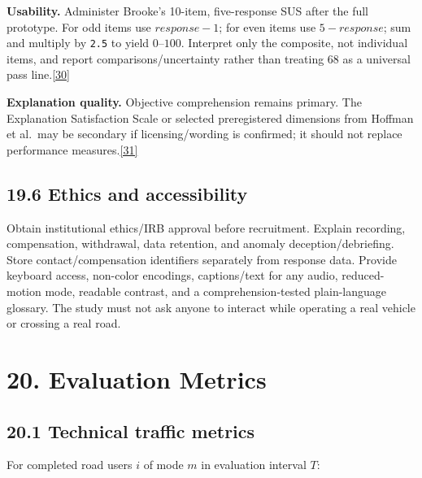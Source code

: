 \documentclass[
  english,
  11pt,
  a4paper,
]{article}
\begin{document}
\textbf{Usability.} Administer Brooke's 10-item, five-response SUS after
the full prototype. For odd items use \(response-1\); for even items use
\(5-response\); sum and multiply by \texttt{2.5} to yield \(0–100\).
Interpret only the composite, not individual items, and report
comparisons/uncertainty rather than treating 68 as a universal pass
line.\hyperref[source-30]{[30]}

\textbf{Explanation quality.} Objective comprehension remains primary.
The Explanation Satisfaction Scale or selected preregistered dimensions
from Hoffman et al.~may be secondary if licensing/wording is confirmed;
it should not replace performance measures.\hyperref[source-31]{[31]}

\subsection{19.6 Ethics and
accessibility}\label{ethics-and-accessibility}

Obtain institutional ethics/IRB approval before recruitment. Explain
recording, compensation, withdrawal, data retention, and anomaly
deception/debriefing. Store contact/compensation identifiers separately
from response data. Provide keyboard access, non-color encodings,
captions/text for any audio, reduced-motion mode, readable contrast, and
a comprehension-tested plain-language glossary. The study must not ask
anyone to interact while operating a real vehicle or crossing a real
road.

\section{20. Evaluation Metrics}\label{evaluation-metrics}

\subsection{20.1 Technical traffic
metrics}\label{technical-traffic-metrics}

For completed road users \(i\) of mode \(m\) in evaluation interval
\(T\):
\end{document}
